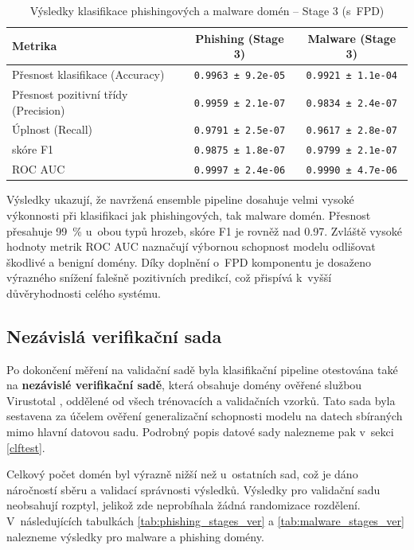 \begin{table}[H]
\centering
\begin{tabular}{|l|c|c|}
\hline
\textbf{Metrika} & \textbf{Phishing (Stage 3)} & \textbf{Malware (Stage 3)} \\
\hline
Přesnost klasifikace (Accuracy)     & \texttt{0.9963 ± 9.2e-05}  & \texttt{0.9921 ± 1.1e-04} \\
Přesnost pozitivní třídy (Precision)    & \texttt{0.9959 ± 2.1e-07}  & \texttt{0.9834 ± 2.4e-07} \\
Úplnost (Recall)        & \texttt{0.9791 ± 2.5e-07}  & \texttt{0.9617 ± 2.8e-07} \\
skóre F1                & \texttt{0.9875 ± 1.8e-07}  & \texttt{0.9799 ± 2.1e-07} \\
ROC AUC                 & \texttt{0.9997 ± 2.4e-06}  & \texttt{0.9990 ± 4.7e-06} \\
\hline
\end{tabular}
\caption{Výsledky klasifikace phishingových a malware domén – Stage 3 (s~FPD)}
\label{tab:final_pipeline_val_combined}
\end{table}



Výsledky ukazují, že navržená ensemble pipeline dosahuje velmi vysoké výkonnosti při klasifikaci jak phishingových, tak malware domén. Přesnost přesahuje 99~\% u~obou typů hrozeb, skóre F1 je rovněž nad 0{.}97. Zvláště vysoké hodnoty metrik ROC AUC naznačují výbornou schopnost modelu odlišovat škodlivé a benigní domény. Díky doplnění o~FPD komponentu je dosaženo výrazného snížení falešně pozitivních predikcí, což přispívá k~vyšší důvěryhodnosti celého systému.

\subsection{Nezávislá verifikační sada}

Po dokončení měření na validační sadě byla klasifikační pipeline otestována také na \textbf{nezávislé verifikační sadě}, která obsahuje domény ověřené službou Virustotal \cite{virtotal}, oddělené od všech trénovacích a validačních vzorků. Tato sada byla sestavena za účelem ověření generalizační schopnosti modelu na datech sbíraných mimo hlavní datovou sadu. Podrobný popis datové sady nalezneme pak v~sekci \ref{clftest}.

Celkový počet domén byl výrazně nižší než u~ostatních sad, což je dáno náročností sběru a validací správnosti výsledků. Výsledky pro validační sadu neobsahují rozptyl, jelikož zde neprobíhala žádná randomizace rozdělení. V~následujících tabulkách \ref{tab:phishing_stages_ver} a \ref{tab:malware_stages_ver} nalezneme výsledky pro malware a phishing domény.

